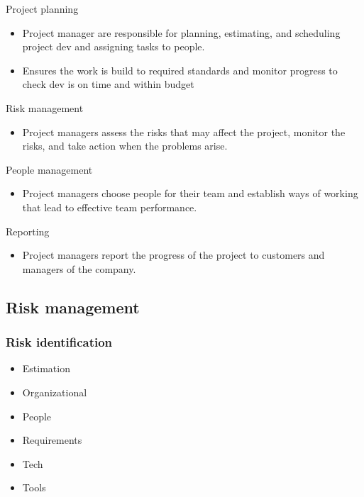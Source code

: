 \documentclass{article}
\begin{document}
    Project planning
    \begin{itemize}
        \item Project manager are responsible for planning, estimating, and scheduling 
        project dev and assigning tasks to people.
        \item Ensures the work is build to required standards and monitor progress to check
        dev is on time and within budget
    \end{itemize}

    Risk management 
    \begin{itemize}
        \item Project managers assess the risks that may affect the project, monitor the 
        risks, and take action when the problems arise.
    \end{itemize}

    People management 
    \begin{itemize}
        \item Project managers choose people for their team and establish ways of working 
        that lead to effective team performance.
    \end{itemize}

    Reporting
    \begin{itemize}
        \item Project managers report the progress of the project to customers and 
        managers of the company.
    \end{itemize}

    \subsection*{Risk management}

    \subsubsection*{Risk identification}
    \begin{itemize}
        \item Estimation 
        \item Organizational 
        \item People 
        \item Requirements 
        \item Tech 
        \item Tools
    \end{itemize}
\end{document}
